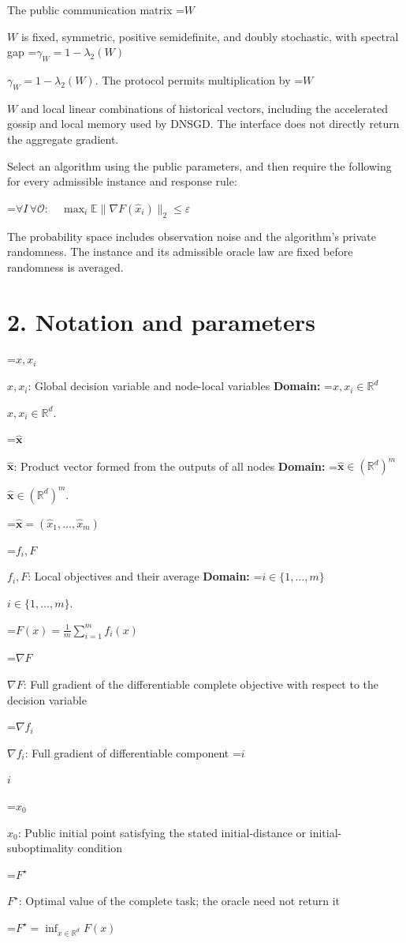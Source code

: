 \documentclass[10pt,a4paper]{article}
\newcommand{\AtlasMath}[1]{\par\begingroup\centering\setbox0=\hbox{$\displaystyle #1$}\ifdim\wd0>1.4\linewidth\typeout{ATLAS WIDE FORMULA: \the\wd0}\fi\ifdim\wd0>\linewidth\resizebox{\linewidth}{!}{\box0}\else\box0\fi\par\endgroup}
\newcommand{\AtlasInlineMath}[1]{\begingroup\setbox0=\hbox{$#1$}\ifdim\wd0>.4\linewidth\endgroup\AtlasMath{#1}\else\endgroup$#1$\fi}
\begin{document}
The public communication matrix \AtlasInlineMath{W} is fixed, symmetric, positive semidefinite, and doubly stochastic, with spectral gap \AtlasInlineMath{\gamma_W=1-\lambda_2(W)}. The protocol permits multiplication by \AtlasInlineMath{W} and local linear combinations of historical vectors, including the accelerated gossip and local memory used by DNSGD. The interface does not directly return the aggregate gradient.

Select an algorithm using the public parameters, and then require the following for every admissible instance and response rule:


\AtlasMath{\forall I\,\forall\mathcal{O}:\quad\max_i\mathbb{E}\|\nabla F(\widehat{x}_i)\|_2\le\varepsilon}


The probability space includes observation noise and the algorithm's private randomness. The instance and its admissible oracle law are fixed before randomness is averaged.

\section{2. Notation and parameters}
\AtlasInlineMath{x,x_i}: Global decision variable and node-local variables \textbf{Domain:} \AtlasInlineMath{x,x_i\in \mathbb{R}^d}.

\AtlasInlineMath{\widehat{\boldsymbol x}}: Product vector formed from the outputs of all nodes \textbf{Domain:} \AtlasInlineMath{\widehat{\boldsymbol x}\in (\mathbb{R}^d)^m}.


\AtlasMath{\widehat{\boldsymbol x}=(\widehat{x}_1,\ldots,\widehat{x}_m)}


\AtlasInlineMath{f_i,F}: Local objectives and their average \textbf{Domain:} \AtlasInlineMath{i\in\{1,\ldots,m\}}.


\AtlasMath{F(x)=\frac1m\sum_{i=1}^m f_i(x)}


\AtlasInlineMath{\nabla F}: Full gradient of the differentiable complete objective with respect to the decision variable

\AtlasInlineMath{\nabla f_i}: Full gradient of differentiable component \AtlasInlineMath{i}

\AtlasInlineMath{x_0}: Public initial point satisfying the stated initial-distance or initial-suboptimality condition

\AtlasInlineMath{F^\star}: Optimal value of the complete task; the oracle need not return it


\AtlasMath{F^\star=\inf_{x\in \mathbb{R}^d}F(x)}
\end{document}
